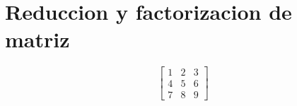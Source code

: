 \documentclass{article}%
\begin{document}
%
\normalsize%
\section{Reduccion y factorizacion de matriz}%
\label{sec:Reduccionyfactorizaciondematriz}%
\[%
\left[\begin{matrix}1 & 2 & 3\\4 & 5 & 6\\7 & 8 & 9\end{matrix}\right]%
\]

%
\end{document}
